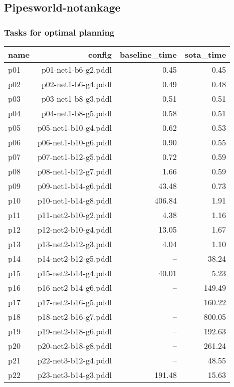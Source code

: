 \documentclass{article}
\begin{document}
                \newpage \subsection{Pipesworld-notankage}
                    \subsubsection*{Tasks for optimal planning}
                    
                            \begin{center}
                            \scriptsize
                            \begin{tabular}{@{}l|r|r|r@{}}
                            name & config & baseline\_time & sota\_time\\\midrule
                              p01& p01-net1-b6-g2.pddl&0.45&0.45\\
  p02& p02-net1-b6-g4.pddl&0.49&0.48\\
  p03& p03-net1-b8-g3.pddl&0.51&0.51\\
  p04& p04-net1-b8-g5.pddl&0.58&0.51\\
  p05& p05-net1-b10-g4.pddl&0.62&0.53\\
  p06& p06-net1-b10-g6.pddl&0.90&0.55\\
  p07& p07-net1-b12-g5.pddl&0.72&0.59\\
  p08& p08-net1-b12-g7.pddl&1.66&0.59\\
  p09& p09-net1-b14-g6.pddl&43.48&0.73\\
  p10& p10-net1-b14-g8.pddl&406.84&1.91\\
  p11& p11-net2-b10-g2.pddl&4.38&1.16\\
  p12& p12-net2-b10-g4.pddl&13.05&1.67\\
  p13& p13-net2-b12-g3.pddl&4.04&1.10\\
  p14& p14-net2-b12-g5.pddl&--&38.24\\
  p15& p15-net2-b14-g4.pddl&40.01&5.23\\
  p16& p16-net2-b14-g6.pddl&--&149.49\\
  p17& p17-net2-b16-g5.pddl&--&160.22\\
  p18& p18-net2-b16-g7.pddl&--&800.05\\
  p19& p19-net2-b18-g6.pddl&--&192.63\\
  p20& p20-net2-b18-g8.pddl&--&261.24\\
  p21& p22-net3-b12-g4.pddl&--&48.55\\
  p22& p23-net3-b14-g3.pddl&191.48&15.63\\

\end{tabular}
\end{center}
\end{document}

